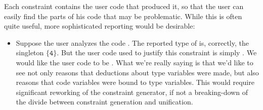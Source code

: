 \documentclass[a4paper]{article}
\begin{document}
Each constraint contains the user code that produced it, so that the user can
easily find the parts of his code that may be problematic.  While this is often
quite useful, more sophisticated reporting would be desirable:

\begin{itemize}
  \item Suppose the user analyzes the code .  The reported type
    of  is, correctly, the singleton $\{\mathtt{4}\}$.  But the user code
    used to justify this constraint is simply .  We would like the user
    code to be .  What we're really saying is that we'd like to
    see not only reasons that deductions about type variables were made, but
    also reasons that code variables were bound to type variables.  This would
    require significant reworking of the constraint generator, if not a
    breaking-down of the divide between constraint generation and unification.
\end{itemize}



\end{document}

